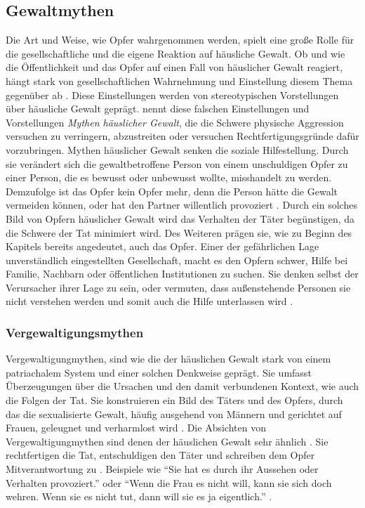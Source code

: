 \subsection{Gewaltmythen}   \label{subsec_2.1.3}
Die Art und Weise, wie Opfer wahrgenommen werden, spielt eine große Rolle für die gesellschaftliche und die eigene Reaktion auf häusliche Gewalt. Ob und wie die Öffentlichkeit und das Opfer auf einen Fall von häuslicher Gewalt reagiert, hängt stark von gesellschaftlichen Wahrnehmung und Einstellung diesem Thema gegenüber ab \parencite{Labelingtheory_plus}. Diese Einstellungen werden von stereotypischen Vorstellungen über häusliche Gewalt geprägt. \textcite{DVMAS_Peters} nennt diese falschen Einstellungen und Vorstellungen \textit{Mythen häuslicher Gewalt}, die die Schwere physische Aggression versuchen zu verringern, abzustreiten oder versuchen Rechtfertigungsgründe dafür vorzubringen. Mythen häuslicher Gewalt senken die soziale Hilfestellung. Durch sie verändert sich die gewaltbetroffene Person von einem unschuldigen Opfer zu einer Person, die es bewusst oder unbewusst wollte, misshandelt zu werden. Demzufolge ist das Opfer kein Opfer mehr, denn die Person hätte die Gewalt vermeiden können, oder hat den Partner willentlich provoziert \parencite{DVMAS_Peters}. Durch ein solches Bild von Opfern häuslicher Gewalt wird das Verhalten der Täter begünstigen, da die Schwere der Tat minimiert wird. Des Weiteren prägen sie, wie zu Beginn des Kapitels bereits angedeutet, auch das Opfer. Einer der gefährlichen Lage unverständlich eingestellten Gesellschaft, macht es den Opfern schwer, Hilfe bei Familie, Nachbarn oder öffentlichen Institutionen zu suchen. Sie denken selbst der Verursacher ihrer Lage zu sein, oder vermuten, dass außenstehende Personen sie nicht verstehen werden und somit auch die Hilfe unterlassen wird \parencite{Gewaltmythen}.

\subsubsection{Vergewaltigungsmythen}  \label{2.1.3.1}
Vergewaltigungmythen, sind wie die der häuslichen Gewalt stark von einem patriachalem System und einer solchen Denkweise geprägt. Sie umfasst Überzeugungen über die Ursachen und den damit verbundenen Kontext, wie auch die Folgen der Tat. Sie konstruieren ein Bild des Täters und des Opfers, durch das die sexualisierte Gewalt, häufig ausgehend von Männern und gerichtet auf Frauen, geleugnet und verharmlost wird \parencite{Vergewaltigung_Bohner_1996}. Die Absichten von Vergewaltigungmythen sind denen der häuslichen Gewalt sehr ähnlich \parencite{DVMAS_Peters}. Sie rechtfertigen die Tat, entschuldigen den Täter und schreiben dem Opfer Mitverantwortung zu \parencite{Vergewaltigung_Boris_2004}. Beispiele wie \enquote{Sie hat es durch ihr Aussehen oder Verhalten provoziert.} oder \enquote{Wenn die Frau es nicht will, kann sie sich doch wehren. Wenn sie es nicht tut, dann will sie es ja eigentlich.} \parencite{Vergewaltigung_Boris_2004}.

